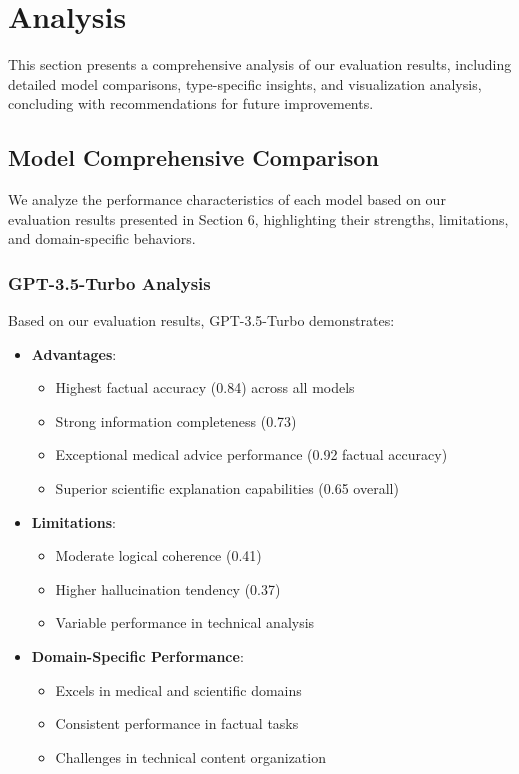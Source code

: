 \section{Analysis}
This section presents a comprehensive analysis of our evaluation results, including detailed model comparisons, type-specific insights, and visualization analysis, concluding with recommendations for future improvements.

\subsection{Model Comprehensive Comparison}
We analyze the performance characteristics of each model based on our evaluation results presented in Section 6, highlighting their strengths, limitations, and domain-specific behaviors.

\subsubsection{GPT-3.5-Turbo Analysis}
Based on our evaluation results, GPT-3.5-Turbo demonstrates:
\begin{itemize}
    \item \textbf{Advantages}:
    \begin{itemize}
        \item Highest factual accuracy (0.84) across all models
        \item Strong information completeness (0.73)
        \item Exceptional medical advice performance (0.92 factual accuracy)
        \item Superior scientific explanation capabilities (0.65 overall)
    \end{itemize}
    \item \textbf{Limitations}:
    \begin{itemize}
        \item Moderate logical coherence (0.41)
        \item Higher hallucination tendency (0.37)
        \item Variable performance in technical analysis
    \end{itemize}
    \item \textbf{Domain-Specific Performance}:
    \begin{itemize}
        \item Excels in medical and scientific domains
        \item Consistent performance in factual tasks
        \item Challenges in technical content organization
    \end{itemize}
\end{itemize}

